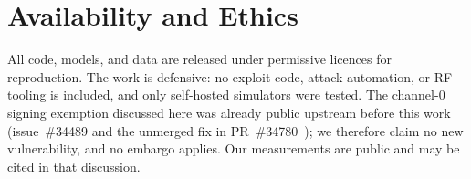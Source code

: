 \documentclass[conference]{IEEEtran}
\begin{document}
\section*{Availability and Ethics}
All code, models, and data are released under permissive licences for
reproduction. The work is defensive: no exploit code, attack automation, or RF
tooling is included, and only self-hosted simulators were tested. The
channel-0 signing exemption discussed here was already public upstream before
this work (issue~\#34489 and the unmerged fix in PR~\#34780~\cite{ardupilot_issue34489,ardupilot_pr34780});
we therefore claim no new vulnerability, and no embargo applies. Our
measurements are public and may be cited in that discussion.



\end{document}
